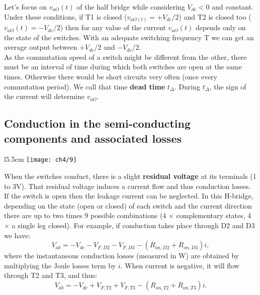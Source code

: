 		Let's focus on $v_{aO}(t)$ of the half bridge while considering $V_{dc}<0$ and constant. Under these conditions, if T1 is closed ($v_{aO(t)} = + V_{dc}/2$) and T2 is closed too ($v_{aO}(t) = -V_{dc}/2$) then for any value of the current $v_{aO}(t)$ depends only on the state of the switches. With an adequate switching frequency T we can get an average output between $+V_{dc}/2$ and $-V_{dc}/2$. \\
		
		As the commutation speed of a switch might be different from the other, there must be an interval of time during which both switches are open at the same times. Otherwise there would be short circuits very often (once every commutation period). We call that time \textbf{dead time} $t_{\Delta}$. During $t_{\Delta}$, the sign of the current will determine $v_{aO}$. 
		
	\subsection{Conduction in the semi-conducting components and associated losses}
		\begin{wrapfigure}[9]{l}{5.5cm}
		\vspace{0mm}
		\texttt{[image: ch4/9]}
		\end{wrapfigure}
		When the switches conduct, there is a slight \textbf{residual voltage} at its terminals (1 to 3V). That residual voltage induces a current flow and thus conduction losses. If the switch is open then the leakage current can be neglected.
		In this H-bridge, depending on the state (open or closed) of each switch and the current direction there are up to two times 9 possible combinations (4 $\times$ complementary states, 4 $\times$ a single leg closed). For example, if conduction takes place through D2 and D3 we have:
		\begin{equation}
			V_{ab} = -V_{dc}-V_{F,D2}-V_{F,D3}-(R_{on,D2}+R_{on,D3})i,
		\end{equation}
		where the instantaneous conduction losses (measured in W) are obtained by multiplying the Joule losses term by $i$. When current is negative, it will flow through T2 and T3, and thus:
		\begin{equation}
			V_{ab} = -V_{dc}+V_{F,T2}+V_{F,T3}-(R_{on,T2}+R_{on,T3})i. 
		\end{equation}
		
